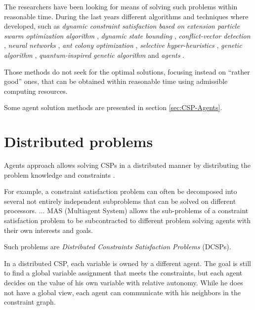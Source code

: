 \documentclass[header]{subfiles}
\begin{document}
\medskip
\noindent
The researchers have been looking for means of solving such problems within
reasonable time. During the last years different algorithms and techniques where
developed, such as
\emph{dynamic constraint satisfaction based on extension particle swarm
      optimization algorithm} \cite{CSPswarm},
\emph{dynamic state bounding} \cite{CSPdynStateBound},
\emph{conflict-vector detection} \cite{CSPtimetable},
\emph{neural networks} \cite{CSPneuro},
\emph{ant colony optimization} \cite{CSPcunningACO, CSPlimmemACO},
\emph{selective hyper-heuristics} \cite{CSPhypHeur},
\emph{genetic algorithm} \cite{UCSP-GA},
\emph{quantum-inspired genetic algorithm} \cite{QuantumGeneticAlgorithm}
and \emph{agents} \cite{CSPagent2013, CSPagent2014, DCSPagent1998}.

\medskip

Those methods do not seek for the optimal solutions, focusing instead on
``rather good'' ones, that can be obtained within reasonable time using admissible
computing resources.

\bigskip

\noindent
Some agent solution methods are presented in section \ref{sec:CSP-Agents}.







\section{Distributed problems}
Agents approach allows solving CSPs in a distributed manner by distributing
the problem knowledge and constraints
\cite{DCSPagent1998, DCSP2013, CSPagent2014, MAS, MAS-Survey}.

\begin{displayquote} %
  For example, a constraint satisfaction problem can often be
  decomposed into several not entirely independent
  subproblems that can be solved on different processors. $\dots$
  MAS (Multiagent System) allows the sub-problems of a constraint satisfaction
  problem to be subcontracted to different problem solving agents with their own
  interests and goals.
\end{displayquote}

\noindent
Such problems are \emph{Distributed Constraints Satisfaction Problems} (DCSPs).
\begin{displayquote} %
  In a distributed CSP, each variable is owned by a different agent. The goal is
  still to find a global variable assignment that meets the constraints, but each agent
  decides on the value of his own variable with relative autonomy. While he does
  not have a global view, each agent can communicate with his neighbors in the
  constraint graph.
\end{displayquote}
\end{document}
